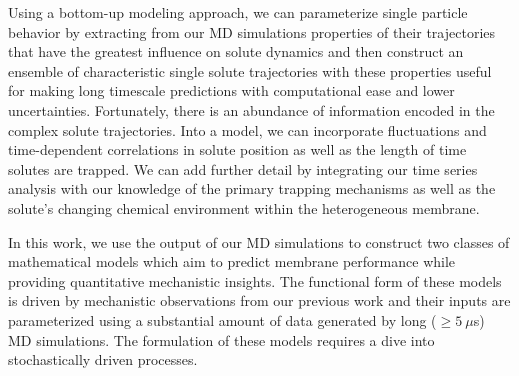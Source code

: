 \documentclass{article}
\begin{document}
  Using a bottom-up modeling approach, we can parameterize single particle behavior
  by 
  extracting from 
  our MD simulations 
  properties
  of their trajectories
  that have the greatest influence on solute dynamics and then construct an ensemble 
  of characteristic single solute trajectories 
  with these properties
  useful for making long timescale
  predictions with computational ease and lower uncertainties. Fortunately, there 
  is an abundance of information encoded in the complex solute trajectories. Into a
  model, we can incorporate fluctuations and time-dependent correlations in solute
  position as well as the length of time solutes are trapped. We can add further
  detail by integrating our time series analysis with our knowledge of the primary
  trapping mechanisms as well as the solute's changing chemical environment within
  the heterogeneous membrane. 

  
  In this work, we use the output of our MD simulations to construct two classes of 
  mathematical models which aim to predict membrane performance while providing quantitative 
  mechanistic insights. The functional form of these models is driven by mechanistic 
  observations from our previous work and their inputs are parameterized using a 
  substantial amount of data generated by long ($\geq 5~\mu$s) MD simulations. 
  The formulation
  of these models requires a dive into stochastically driven processes.
  
\end{document}
